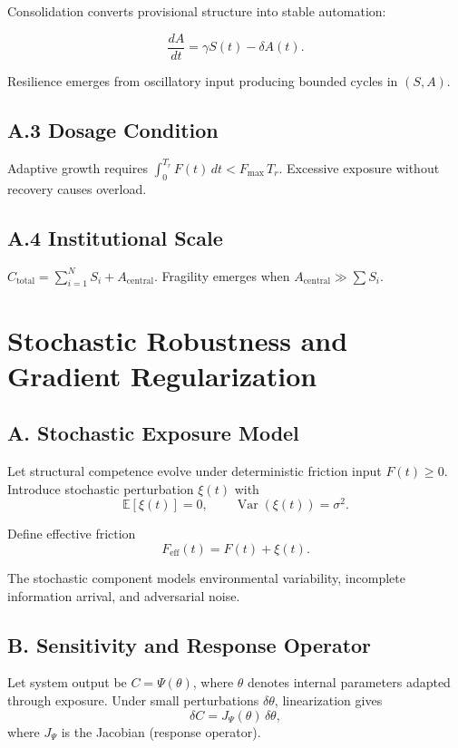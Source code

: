 \documentclass[11pt]{article}
\theoremstyle{remark}
\begin{document}
Consolidation converts provisional structure into stable automation:

\[
\frac{dA}{dt} = \gamma S(t) - \delta A(t).
\]

Resilience emerges from oscillatory input producing bounded cycles in $(S, A)$.

\subsection*{A.3 Dosage Condition}

Adaptive growth requires $\int_0^{T_r} F(t)\,dt < F_{\max}\, T_r$. Excessive exposure without recovery causes overload.

\subsection*{A.4 Institutional Scale}

$C_{\text{total}} = \sum_{i=1}^N S_i + A_{\text{central}}$. Fragility emerges when $A_{\text{central}} \gg \sum S_i$.

\section{Stochastic Robustness and Gradient Regularization}
\label{app:stochastic}

\subsection*{A. Stochastic Exposure Model}

Let structural competence evolve under deterministic friction input $F(t) \geq 0$. Introduce stochastic perturbation $\xi(t)$ with
\[
\mathbb{E}[\xi(t)] = 0,
\qquad
\operatorname{Var}(\xi(t)) = \sigma^2.
\]

Define effective friction
\[
F_{\text{eff}}(t) = F(t) + \xi(t).
\]

The stochastic component models environmental variability, incomplete information arrival, and adversarial noise.

\subsection*{B. Sensitivity and Response Operator}

Let system output be $C = \Psi(\theta)$, where $\theta$ denotes internal parameters adapted through exposure. Under small perturbations $\delta \theta$, linearization gives
\[
\delta C = J_\Psi(\theta)\,\delta \theta,
\]
where $J_\Psi$ is the Jacobian (response operator).
\end{document}
